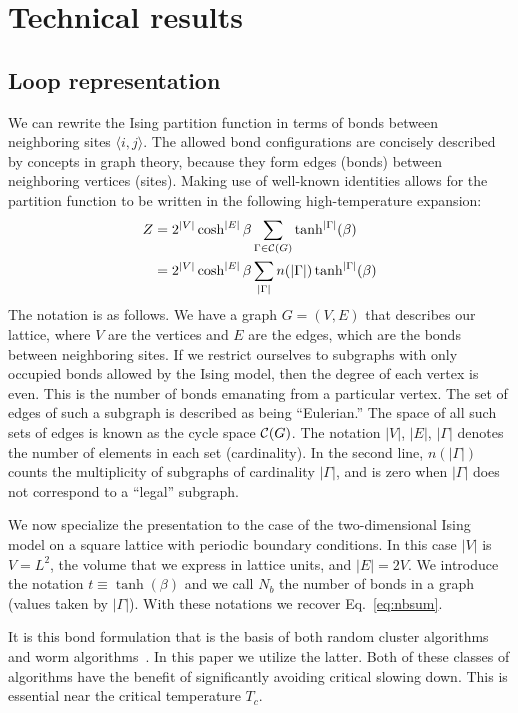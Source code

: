 \documentclass[../main.tex]{subfiles}
\begin{document}
\section{Technical results}%
\label{sec:technical_results}
\subsection{Loop representation}%
\label{ssec:loop_representation}
We can rewrite the Ising partition function in terms of bonds between
neighboring sites $\langle i , j \rangle$.
%
The allowed bond configurations are concisely described by concepts in graph
theory, because they form edges (bonds) between neighboring vertices (sites).
%
Making use of well-known identities allows for the partition function to be
written in the following high-temperature expansion:
%
\begin{align}
    Z &= 2^{|V|} \cosh^{|E|} \beta \sum_{\Gamma \in {\cal C}(G)}
			\tanh^{|\Gamma|}(\beta) \\
		&= 2^{|V|} \cosh^{|E|} \beta \sum_{|\Gamma|} n(|\Gamma|)
			\tanh^{|\Gamma|}(\beta)
\label{eq:z}
\end{align}
%
The notation is as follows.
%
We have a graph $G=(V,E)$ that describes our lattice, where $V$ are the
vertices and $E$ are the edges, which are the bonds between neighboring sites.
%
If we restrict ourselves to subgraphs with only occupied bonds allowed by the
Ising model, then the degree of each vertex is even.
%
This is the number of bonds emanating from a particular vertex.
%
The set of edges of such a subgraph is described as being ``Eulerian.''
%
The space of all such sets of edges is known as the cycle space ${\cal C}(G)$.
%
The notation $|V|$, $|E|$, $|\Gamma|$ denotes the number of elements in each
set (cardinality).
%
In the second line, $n(|\Gamma|)$ counts the multiplicity of subgraphs of
cardinality $|\Gamma|$, and is zero when $|\Gamma|$ does not correspond to a
``legal'' subgraph.

We now specialize the presentation to the case of the two-dimensional Ising
model on a square lattice with periodic boundary conditions.
%
In this case $|V|$ is $V=L^2$, the volume that we express in lattice units, and
$|E| = 2V$.
%
We introduce the notation $t\equiv\tanh(\beta)$ and we call $N_b$ the number of
bonds in a graph (values taken by $|\Gamma|$).
%
With these notations we recover Eq.~\ref{eq:nbsum}.

It is this bond formulation that is the basis of both random cluster
algorithms~\cite{Swendsen:1987ce} and worm algorithms~\cite{prok87}.
%
In this paper we utilize the latter.
%
Both of these classes of algorithms have the benefit of significantly avoiding
critical slowing down.
%
This is essential near the critical temperature $T_c$.
\end{document}
